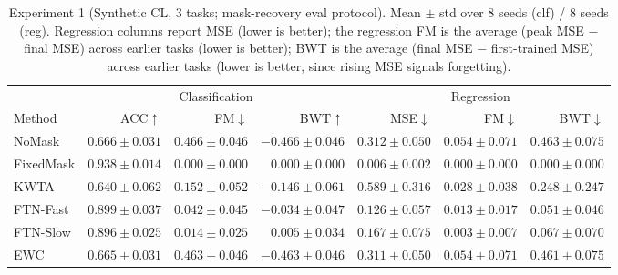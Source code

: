 \begin{table}[h]
\centering
\caption{Experiment 1 (Synthetic CL, 3 tasks; mask-recovery eval protocol).  Mean $\pm$ std over 8 seeds (clf) / 8 seeds (reg).  Regression columns report MSE (lower is better); the regression FM is the average (peak MSE $-$ final MSE) across earlier tasks (lower is better); BWT is the average (final MSE $-$ first-trained MSE) across earlier tasks (lower is better, since rising MSE signals forgetting).}
\label{tab:exp1}
\small
\begin{tabular}{l rrr rrr}
\toprule
 & \multicolumn{3}{c}{Classification} & \multicolumn{3}{c}{Regression} \\
\cmidrule(lr){2-4}\cmidrule(lr){5-7}
Method & ACC$\uparrow$ & FM$\downarrow$ & BWT$\uparrow$ & MSE$\downarrow$ & FM$\downarrow$ & BWT$\downarrow$ \\
\midrule
NoMask & $0.666\pm0.031$ & $0.466\pm0.046$ & $-0.466\pm0.046$ & $0.312\pm0.050$ & $0.054\pm0.071$ & $0.463\pm0.075$ \\
FixedMask & $0.938\pm0.014$ & $0.000\pm0.000$ & $0.000\pm0.000$ & $0.006\pm0.002$ & $0.000\pm0.000$ & $0.000\pm0.000$ \\
KWTA & $0.640\pm0.062$ & $0.152\pm0.052$ & $-0.146\pm0.061$ & $0.589\pm0.316$ & $0.028\pm0.038$ & $0.248\pm0.247$ \\
FTN-Fast & $0.899\pm0.037$ & $0.042\pm0.045$ & $-0.034\pm0.047$ & $0.126\pm0.057$ & $0.013\pm0.017$ & $0.051\pm0.046$ \\
FTN-Slow & $0.896\pm0.025$ & $0.014\pm0.025$ & $0.005\pm0.034$ & $0.167\pm0.075$ & $0.003\pm0.007$ & $0.067\pm0.070$ \\
EWC & $0.665\pm0.031$ & $0.463\pm0.046$ & $-0.463\pm0.046$ & $0.311\pm0.050$ & $0.054\pm0.071$ & $0.461\pm0.075$ \\
\bottomrule
\end{tabular}
\end{table}
